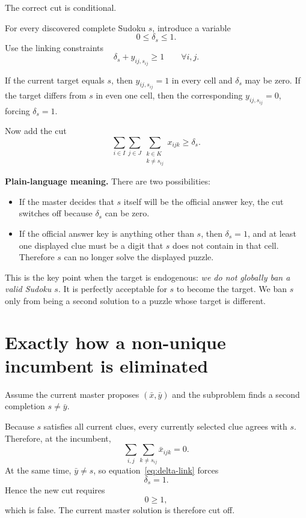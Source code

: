 \documentclass[11pt]{article}
\newcommand{\clue}{x}
\newcommand{\target}{y}
\begin{document}
The correct cut is conditional.

For every discovered complete Sudoku $s$, introduce a variable
\[
0\le \delta_s\le 1.
\]
Use the linking constraints
\begin{equation}
\delta_s + \target_{ij,s_{ij}} \ge 1
\qquad \forall i,j.
\label{eq:delta-link}
\end{equation}

If the current target equals $s$, then $y_{ij,s_{ij}}=1$ in every cell and $\delta_s$ may be zero. If the target differs from $s$ in even one cell, then the corresponding $y_{ij,s_{ij}}=0$, forcing $\delta_s=1$.

Now add the cut
\begin{equation}
\sum_{i\in I}\sum_{j\in J}\sum_{\substack{k\in K\\k\ne s_{ij}}}
\clue_{ijk}
\ge \delta_s.
\label{eq:benders-cut}
\end{equation}

\textbf{Plain-language meaning.} There are two possibilities:
\begin{itemize}
    \item If the master decides that $s$ itself will be the official answer key, the cut switches off because $\delta_s$ can be zero.
    \item If the official answer key is anything other than $s$, then $\delta_s=1$, and at least one displayed clue must be a digit that $s$ does not contain in that cell. Therefore $s$ can no longer solve the displayed puzzle.
\end{itemize}

This is the key point when the target is endogenous: \emph{we do not globally ban a valid Sudoku $s$}. It is perfectly acceptable for $s$ to become the target. We ban $s$ only from being a second solution to a puzzle whose target is different.

\section{Exactly how a non-unique incumbent is eliminated}

Assume the current master proposes $(\bar x,\bar y)$ and the subproblem finds a second completion $s\neq\bar y$.

Because $s$ satisfies all current clues, every currently selected clue agrees with $s$. Therefore, at the incumbent,
\[
\sum_{i,j}\sum_{k\ne s_{ij}} \bar x_{ijk}=0.
\]
At the same time, $\bar y\neq s$, so equation~\eqref{eq:delta-link} forces
\[
\delta_s=1.
\]
Hence the new cut requires
\[
0\ge 1,
\]
which is false. The current master solution is therefore cut off.
\end{document}
